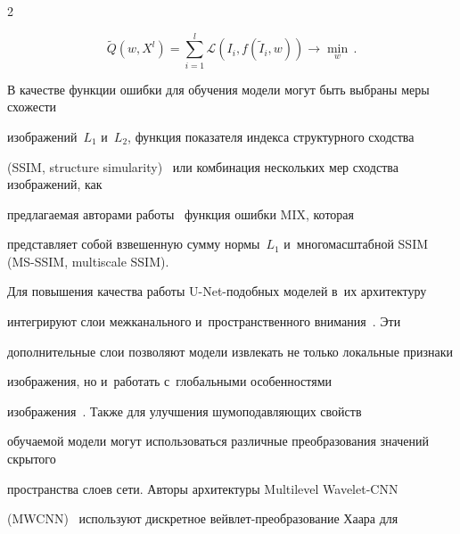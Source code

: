 \begin{multicols}{2}
\vspace*{-2pt}





\noindent


\begin{equation*}


\label{eq:main_problem}


\tilde{Q}(w, X^{l}) = \sum\limits_{i=1}^{l}\mathcal{L}(I_i, 


f(\tilde{I}_i, w)) \rightarrow \min\limits_{w}\,.


\end{equation*}





\vspace*{-4pt}





В качестве функции ошибки для обучения модели могут быть выбраны меры схожести 


изображений~$L_{1}$ и~$L_{2}$, функция показателя индекса структурного сходства 


(SSIM, structure simularity)~\cite{SSIM} или комбинация нескольких мер сходства изображений, как 


предлагаемая авторами работы~\cite{MIX_LOSS} функция ошибки MIX, которая 


представляет собой взвешенную сумму нормы~$L_{1}$ и~многомасштабной SSIM (MS-SSIM, multiscale SSIM).





Для повышения качества работы U-Net-по\-доб\-ных моделей в~их архитектуру 


интегрируют слои межканального и~пространственного внимания~\cite{CBAMCB}. Эти 


дополнительные слои позволяют модели извлекать не только локальные признаки 


изоб\-ра\-же\-ния, но и~работать с~глобальными особенностями 


изображения~\cite{CBAM_USAGE}. Также для улучшения шумоподавляющих свойств 


обучаемой модели могут использоваться различные преобразования значений скрытого 


пространства слоев сети. Авторы архитектуры Multilevel Wavelet-CNN 


(MWCNN)~\cite{MWCNN} используют дискретное вейв\-лет-пре\-обра\-зо\-ва\-ние Хаара для 



\end{multicols}
